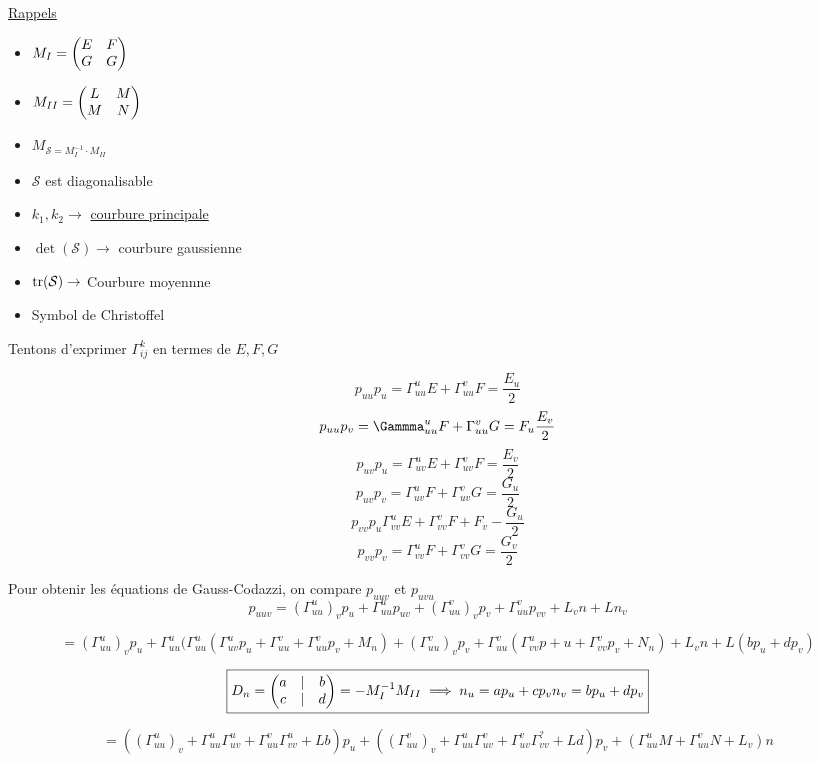 



\underline{Rappels} 

\begin{itemize}
	\item $M_{I} = \begin{pmatrix} E & F \\ G & G \end{pmatrix}$	
	\item $M_{II} =\begin{pmatrix} L & M\\ M &N \end{pmatrix}$
	\item $M_{\mathcal{S} = M_{I}^{-1}\cdot M_{II} } $
	\item $\mathcal{S}$ est diagonalisable
	\item $k_{1},k_{2} \to$ \underline{courbure principale} 
	\item $\det(\mathcal{S} ) \to $ courbure gaussienne
	\item $\tr(\mathcal{S} )\to$ Courbure moyennne
	\item Symbol de Christoffel
\end{itemize}
	
Tentons d'exprimer $\Gamma_{ij}^k$ en termes de $E,F,G$ 

$$p_{uu} p_{u} = \Gamma_{uu}^u E + \Gamma_{uu}^v F = \frac{E_{u}}{2} $$ 
$$p_{uu}p_{v} = \Gammma_{uu}^u F + \Gamma_{uu}^v G = F_{u} \frac{E_{v}}{2} $$ 
$$p_{uv} p_{u} = \Gamma_{uv}^u E + \Gamma_{uv}^v F = \frac{E_{v}}{2} $$ 
$$p_{uv} p_{v} = \Gamma_{uv}^u F + \Gamma_{uv}^v G= \frac{G_{u}}{2} $$ 
$$p_{vv} p_{u} \Gamma_{vv}^u E + \Gamma_{vv}^v F + F_{v} - \frac{G_{u}}{2} $$ 
$$p_{vv} p_{v} = \Gamma_{vv}^u F + \Gamma_{vv}^v G = \frac{G_{v}}{2}  $$ 

Pour obtenir les équations de Gauss-Codazzi, on compare $p_{uuv}$ et $p_{uvu} $  $$p_{uuv} = \left( \Gamma_{uu}^u \right)_v p_{u}  + \Gamma_{uu}^up_{uv} + \left( \Gamma_{uu}^v \right)_v p_{v} + \Gamma_{uu}^vp_{vv} + L_{v} n + L n_{v} $$ 

$$= \left( \Gamma_{uu}^u \right)_v p_{u} + \Gamma_{uu}^u(\Gamma_{uu}^u \left( \Gamma_{uv}^u p_{u} + \Gamma_{uu}^v + \Gamma_{uu}^v p_{v} +M_n \right)  + \left( \Gamma_{uu}^v \right)_v p_{v} + \Gamma_{uu}^v\left(\Gamma_{vv}^u p+u + \Gamma_{vv}^v p_{v} + N_{n}   \right) +L_{v} n + L (bp_{u} + dp_{v} ) $$ 


$$\boxed{D_{n} = \begin{pmatrix} a & | & b\\ c&| &d  \end{pmatrix} = -M_{I}^{-1}M_{II}\\ \implies n_{u} = ap_{u} + cp_{v} \\ n_{v} = bp_{u}+dp_{v} }$$ 
	

$$=\left( \left( \Gamma_{uu}^u \right)_v + \Gamma_{uu}^u\Gamma_{uv}^u + \Gamma_{uu}^v\Gamma_{vv}^u + Lb \right) p_{u} + \left( \left( \Gamma_{uu}^v \right)_v + \Gamma_{uu}^u\Gamma_{uv}^v + \Gamma_{uv}^v\Gamma_{vv}^? + Ld \right) p_{v} + \left( \Gamma_{uu}^u M + \Gamma_{uu}^v N + L_v \right) n$$ 

